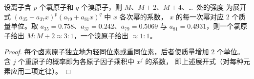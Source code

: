 \begin{proposition}[氯和溴]\label{prop:b2:mass-spec-atomic:halogen-patterns}
设离子含 $p$ 个氯原子和 $q$ 个溴原子，则 $M$、$M+2$、$M+4$、\dots\ 处的强度
为展开式 $(a_{35} + a_{37}x)^p(a_{79} + a_{81}x)^q$ 中 $x$ 各次幂的系数，
$x$ 的每一次幂对应 2 个质量单位。取 $a_{35} = 0.758$、$a_{37} = 0.242$、$a_{79} = 0.5069$ 与
$a_{81} = 0.4931$，则一个氯原子给出 $M : M+2 \approx 3 : 1$，一个溴原子给出 $\approx 1 : 1$。
\end{proposition}

\begin{proof}
每个卤素原子独立地为轻同位素或重同位素，后者使质量增加 2 个单位。含
$j$ 个重原子的概率即为各原子因子乘积中 $x^j$ 的系数，
即上述展开式（对每种元素应用二项定律）。
\end{proof}

